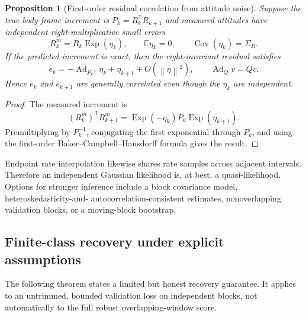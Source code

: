 \documentclass[11pt]{article}
\newtheorem{proposition}[theorem]{Proposition}
\newcommand{\T}{\mathsf{T}}
\newcommand{\Exp}{\operatorname{Exp}}
\newcommand{\Ad}{\operatorname{Ad}}
\newcommand{\norm}[1]{\left\lVert #1 \right\rVert}
\begin{document}
    \begin{proposition}[First-order residual correlation from attitude noise]
Suppose the true body-frame increment is $P_k=R_k^{\T} R_{k+1}$ and measured attitudes
have independent right-multiplicative small errors
\begin{equation}
    R_k^m=R_k\Exp(\eta_k),
    \qquad
    \mathbb E\eta_k=0,
    \qquad
    \operatorname{Cov}(\eta_k)=\Sigma_R.
\end{equation}
If the predicted increment is exact, then the right-invariant residual satisfies
\begin{equation}
    e_k
    =-\Ad_{P_k^{-1}}\eta_k+\eta_{k+1}+O(\norm{\eta}^2),
    \qquad
    \Ad_Qv=Qv.
\end{equation}
Hence $e_k$ and $e_{k+1}$ are generally correlated even though the $\eta_k$ are
independent.
    \end{proposition}

    \begin{proof}
        The measured increment is
        \begin{equation}
            (R_k^m)^{\T} R_{k+1}^m
        =\Exp(-\eta_k)P_k\Exp(\eta_{k+1}).
        \end{equation}
        Premultiplying by $P_k^{-1}$, conjugating the first exponential through $P_k$, and using
        the first-order Baker--Campbell--Hausdorff formula gives the result.
    \end{proof}

    Endpoint rate interpolation likewise shares rate samples across adjacent intervals.
    Therefore an independent Gaussian likelihood is, at best, a quasi-likelihood. Options
    for stronger inference include a block covariance model, heteroskedasticity-and-
    autocorrelation-consistent estimates, nonoverlapping validation blocks, or a moving-block
    bootstrap.

    \subsection{Finite-class recovery under explicit assumptions}

    The following theorem states a limited but honest recovery guarantee. It applies to an
    untrimmed, bounded validation loss on independent blocks, not automatically to the full
    robust overlapping-window score.
\end{document}
